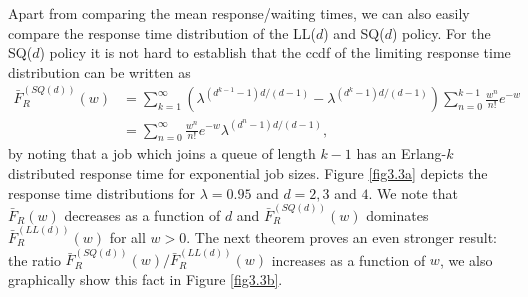 \documentclass[12pt]{report}
\begin{document}
Apart from comparing the mean response/waiting times, we can also easily compare the response time distribution
of the LL($d$) and SQ($d$) policy. For the SQ($d$) policy it is not hard to establish that the ccdf of
the limiting response time distribution can be written as 
\begin{align}\label{eq:FRSQd}
\bar{F}_R^{(SQ(d))}(w) &= \sum_{k=1}^\infty \left(\lambda^{(d^{k-1}-1)d/(d-1)}-\lambda^{(d^{k}-1)d/(d-1)}\right) \sum_{n=0}^{k-1} \frac{w^n}{n!} e^{-w}
\nonumber \\
&=\sum_{n=0}^\infty  \frac{w^n}{n!} e^{-w} \lambda^{(d^n-1)d/(d-1)},
\end{align}
by noting that a job which joins a queue of length $k-1$ has an Erlang-$k$ distributed response time
for exponential job sizes. 
Figure \ref{fig3.3a} depicts the response
time distributions for $\lambda = 0.95$ and $d=2,3$ and $4$. We note that $\bar{F}_R(w)$
decreases as a function of $d$ and $\bar{F}^{(SQ(d))}_R(w)$ dominates
$\bar{F}^{(LL(d))}_R(w)$ for all $w > 0$. The next theorem proves an even stronger result: the ratio $\bar F^{(SQ(d))}_R(w)/\bar F^{(LL(d))}_R(w)$ increases as a function of $w$, we also graphically show this fact in Figure \ref{fig3.3b}.
\end{document}
